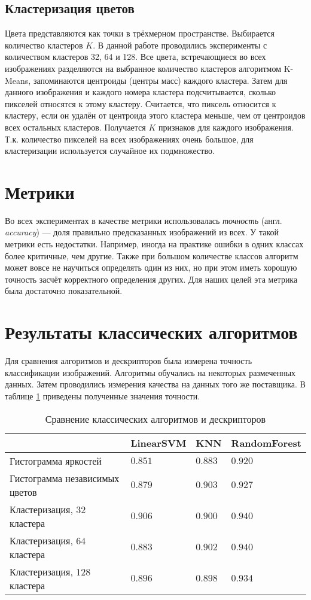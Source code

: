 \subsection{Кластеризация цветов}
Цвета представляются как точки в трёхмерном пространстве. Выбирается количество
кластеров $K$. В данной работе проводились эксперименты с количеством кластеров
32, 64 и 128. Все цвета, встречающиеся во всех изображениях разделяются на
выбранное количество кластеров алгоритмом K-Means, запоминаются центроиды
(центры масс) каждого кластера. Затем для данного изображения и каждого номера
кластера подсчитывается, сколько пикселей относятся к этому кластеру. Считается,
что пиксель относится к кластеру, если он удалён от центроида этого кластера
меньше, чем от центроидов всех остальных кластеров. Получается $K$ признаков для
каждого изображения. Т.к. количество пикселей на всех изображениях очень
большое, для кластеризации используется случайное их подмножество.


\section{Метрики}
Во всех экспериментах в качестве метрики использовалась \textit{точ\-ность}
(англ. \textit{ac\-cu\-ra\-cy}) --- доля правильно предсказанных изображений из всех. У
такой метрики есть недостатки. Например, иногда на практике ошибки в одних
классах более критичные, чем другие. Также при большом количестве классов
алгоритм может вовсе не научиться определять один из них, но при этом иметь
хорошую точность засчёт корректного определения других. Для наших целей эта
метрика была достаточно показательной.


\section{Результаты классических алгоритмов}
Для сравнения алгоритмов и дескрипторов была измерена точность классификации
изображений. Алгоритмы обучались на некоторых размеченных данных. Затем
проводились измерения качества на данных того же поставщика. В таблице
\ref{table:classical_algo__comparison} приведены полученные значения точности.

\begin{table}[ht]
\caption{Сравнение классических алгоритмов и дескрипторов}
\label{table:classical_algo__comparison}
\small
\begin{tabular}{|m{68mm}|m{26mm}|m{26mm}|m{28mm}|}
    \hline
    & LinearSVM & KNN & RandomForest\\
    \hline
    Гистограмма яркостей           & $0.851$ & $0.883$ & $0.920$\\
    \hline
    Гистограмма независимых цветов & $0.879$ & $0.903$ & $0.927$\\
    \hline
    Кластеризация, $32$ кластера   & $0.906$ & $0.900$ & $0.940$\\
    \hline
    Кластеризация, $64$ кластера   & $0.883$ & $0.902$ & $0.940$\\
    \hline
    Кластеризация, $128$ кластера  & $0.896$ & $0.898$ & $0.934$\\
    \hline
\end{tabular}
\end{table}

